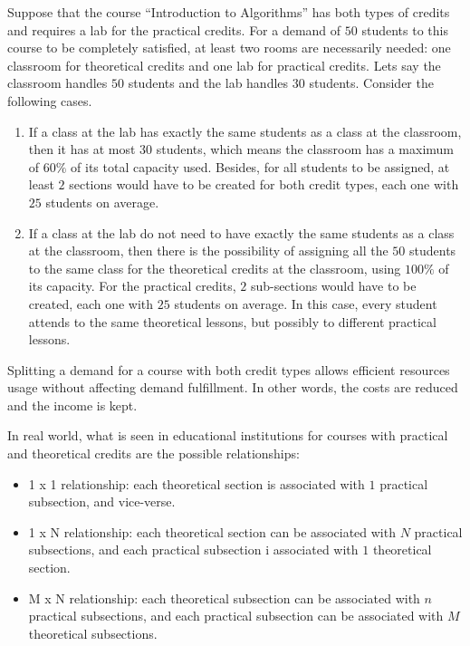 Suppose that the course ``Introduction to Algorithms'' has both types of credits and requires a lab for the practical credits.  For a demand of $50$ students to this course to be completely satisfied, at least two rooms are necessarily needed: one classroom for theoretical credits and one lab for practical credits. Lets say the classroom handles $50$ students and the lab handles $30$ students. Consider the following cases.
\begin{enumerate}
\item If a class at the lab has exactly the same students as a class at the classroom, then it has at most $30$ students, which means the classroom has a maximum of $60\%$ of its total capacity used. Besides, for all students to be assigned, at least $2$ sections would have to be created for both credit types, each one with $25$ students on average.
\item If a class at the lab do not need to have exactly the same students as a class at the classroom, then there is the possibility of assigning all the $50$ students to the same class for the theoretical credits at the classroom, using $100\%$ of its capacity. For the practical credits, $2$ sub-sections would have to be created, each one with $25$ students on average. In this case, every student attends to the same theoretical lessons, but possibly to different practical lessons.
\end{enumerate}

Splitting a demand for a course with both credit types allows efficient resources usage without affecting demand fulfillment. In other words, the costs are reduced and the income is kept.

In real world, what is seen in educational institutions for courses with practical and theoretical credits are the possible relationships:
\begin{itemize}
\item 1 x 1 relationship: each theoretical section is associated with $1$ practical subsection, and vice-verse.
\item 1 x N relationship: each theoretical section can be associated with $N$ practical subsections, and each practical subsection i associated with $1$ theoretical section.
\item M x N relationship: each theoretical subsection can be associated with $n$ practical subsections, and each practical subsection can be associated with $M$ theoretical subsections.
\end{itemize}

